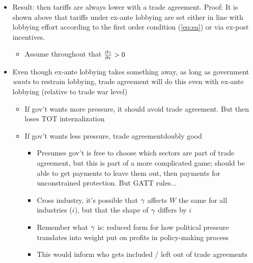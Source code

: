 	
		\begin{itemize}
			
			
			
		\item Result: then tariffs are always lower with a trade agreement.
			Proof: It is shown above that tariffs under ex-ante lobbying are set either in line with lobbying effort according to the first order condition (\ref{eq:ea}) or via ex-post incentives. 
				\begin{itemize}
					\item Assume throughout that $\frac{\partial \gamma}{\partial e} > 0$
				\end{itemize}
			\item Even though ex-ante lobbying takes something away, as long as government \textit{wants} to restrain lobbying, trade agreement will do this even with ex-ante lobbying (relative to trade war level)
				\begin{itemize}
					\item If gov't wants more pressure, it should avoid trade agreement. But then loses TOT internalization
					\item If gov't wants less pressure, trade agreementdoubly good
						\begin{itemize}
							\item Presumes gov't is free to choose which sectors are part of trade agreement, but this is part of a more complicated game; should be able to get payments to leave them out, then payments for unconstrained protection. But GATT rules...
							\item Cross industry, it's possible that $\gamma$ affects $W$ the same for all industries ($i$), but that the shape of $\gamma$ differs by $i$
							\item Remember what $\gamma$ is: reduced form for how political pressure translates into weight put on profits in policy-making process
							\item This would inform who gets included / left out of trade agreements
						\end{itemize}
					\end{itemize}
		\end{itemize}
		
